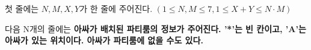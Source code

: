 첫 줄에는 $N, M, X, Y$가 한 줄에 주어진다. $(1 \le N,M \le 7, 1 \le X+Y \le N \cdot M)$

다음 N개의 줄에는 \bf{아싸}가 배치된 파티룸의 정보가 주어진다. '*'는 빈 칸이고, 'A'는 \bf{아싸}가 있는 위치이다. \bf{아싸}가 파티룸에 없을 수도 있다.
